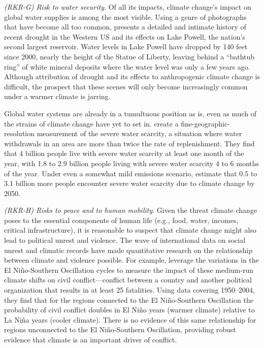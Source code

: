 \textit{(RKR-G) Risk to water security}. Of all its impacts, climate change's impact on global water supplies is among the most visible. Using a genre of photographs that have become all too common, \cite{kolbert2021lost} presents a detailed and intimate history of recent drought in the Western US and its effects on Lake Powell, the nation's second largest reservoir. Water levels in Lake Powell have dropped by 140 feet since 2000, nearly the height of the Statue of Liberty, leaving behind a ``bathtub ring'' of white mineral deposits where the water level was only a few years ago. Although attribution of drought and its effects to anthropogenic climate change is difficult, the prospect that these scenes will only become increasingly common under a warmer climate is jarring. 

Global water systems are already in a tumultuous position as is, even as much of the strains of climate change have yet to set in. \cite{mekonnen2016four} create a fine-geographic-resolution measurement of the severe water scarcity, a situation where water withdrawals in an area are more than twice the rate of replenishment. They find that 4 billion people live with severe water scarcity at least one month of the year, with 1.8 to 2.9 billion people living with severe water scarcity 4 to 6 months of the year. Under even a somewhat mild emissions scenario, \cite{gosling2016global} estimate that 0.5 to 3.1 billion more people encounter severe water scarcity due to climate change by 2050. 

\textit{(RKR-H) Risks to peace and to human mobility}. Given the threat climate change poses to the essential components of human life (e.g., food, water, incomes, critical infrastructure), it is reasonable to suspect that climate change might also lead to political unrest and violence. The wave of international data on social unrest and climatic records have made quantitative research on the relationship between climate and violence possible. For example, \cite{hsiang2011civil} leverage the variations in the El Ni\~no-Southern Oscillation cycles to measure the impact of these medium-run climate shifts on civil conflict---conflict between a country and another political organization that results in at least 25 fatalities. Using data covering 1950--2004, they find that for the regions connected to the El Ni\~no-Southern Oscillation the probability of civil conflict doubles in El Ni\~no years (warmer climate) relative to La Ni\~na years (cooler climate). There is no evidence of this same relationship for regions unconnected to the El Ni\~no-Southern Oscillation, providing robust evidence that climate is an important driver of conflict. 

